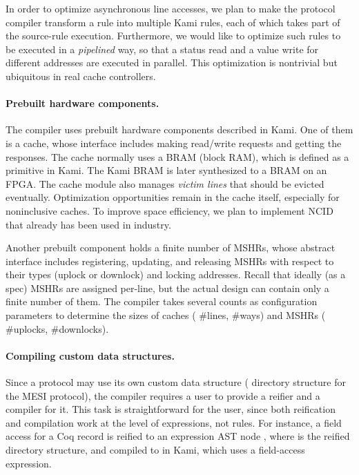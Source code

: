 In order to optimize asynchronous line accesses, we plan to make the protocol compiler transform a \hemiola{} rule into multiple Kami rules, each of which takes part of the source-rule execution.
Furthermore, we would like to optimize such rules to be executed in a \emph{pipelined} way, so that a status read and a value write for different addresses are executed in parallel.
This optimization is nontrivial but ubiquitous in real cache controllers.

\paragraph{Prebuilt hardware components.}
The compiler uses prebuilt hardware components described in Kami.
One of them is a cache, whose interface includes making read/write requests and getting the responses.
The cache normally uses a BRAM (block RAM), which is defined as a primitive in Kami.
The Kami BRAM is later synthesized to a BRAM on an FPGA.
The cache module also manages \emph{victim lines} that should be evicted eventually.
Optimization opportunities remain in the cache itself, especially for noninclusive caches.
To improve space efficiency, we plan to implement NCID~\cite{Zhao:2010,Yan:2019} that already has been used in industry.

Another prebuilt component holds a finite number of MSHRs, whose abstract interface includes registering, updating, and releasing MSHRs with respect to their types (uplock or downlock) and locking addresses.
Recall that ideally (as a spec) MSHRs are assigned per-line, but the actual design can contain only a finite number of them.
The compiler takes several counts as configuration parameters to determine the sizes of caches (\eg{} \#lines, \#ways) and MSHRs (\eg{} \#uplocks, \#downlocks).

\paragraph{Compiling custom data structures.}
Since a \hemiola{} protocol may use its own custom data structure (\eg{} directory structure for the MESI protocol), the compiler requires a user to provide a reifier and a compiler for it.
This task is straightforward for the user, since both reification and compilation work at the level of expressions, not rules.
For instance, a field access  for a Coq record  is reified to an expression AST node , where  is the reified directory structure, and compiled to  in Kami, which uses a field-access expression.

